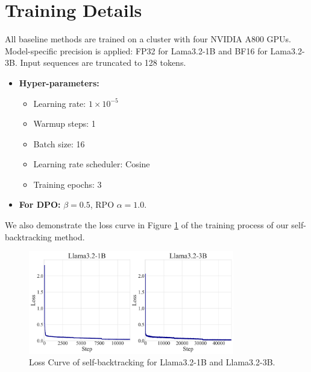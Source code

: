 \documentclass{article}
\theoremstyle{plain}
\theoremstyle{definition}
\theoremstyle{remark}
\begin{document}
\section{Training Details}
\label{app:train}
 All baseline methods are trained on a cluster with four NVIDIA A800 GPUs. Model-specific precision is applied: FP32 for Lama3.2-1B and BF16 for Lama3.2-3B. Input sequences are truncated to 128 tokens.
\begin{itemize}
    \item \textbf{Hyper-parameters:}
    \begin{itemize}
        \item Learning rate: $1 \times 10^{-5}$
        \item Warmup steps: 1
        \item Batch size: 16
        \item Learning rate scheduler: Cosine
        \item Training epochs: 3
    \end{itemize}
    \item \textbf{For DPO:} $\beta = 0.5$, RPO $\alpha= 1.0$.
\end{itemize}

We also demonstrate the loss curve in Figure \ref{fig:loss} of the training process of our self-backtracking method.

\begin{figure}[htbp]
  \centering
\includegraphics[width=0.8\textwidth]{fig/loss_subplots.png}
  \caption{Loss Curve of self-backtracking for Llama3.2-1B and Llama3.2-3B.}
  \label{fig:loss}
\end{figure}
\end{document}
